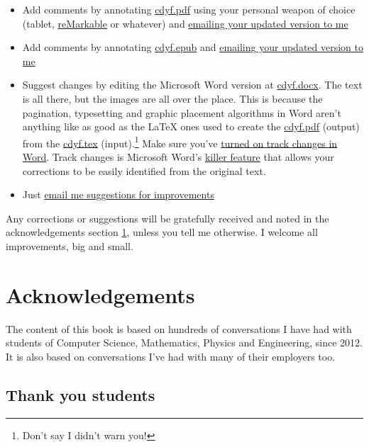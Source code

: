 \documentclass[
]{book}
\providecommand{\tightlist}{%
  \setlength{\itemsep}{0pt}\setlength{\parskip}{0pt}}
\begin{document}
\begin{itemize}
\tightlist
\item
  Add comments by annotating \href{https://www.cdyf.me/cdyf.pdf}{cdyf.pdf} using your personal weapon of choice (tablet, \href{https://en.wikipedia.org/wiki/ReMarkable}{reMarkable} or whatever) and \href{http://www.cs.man.ac.uk/~hulld/contact.html}{emailing your updated version to me}
\item
  Add comments by annotating \href{https://www.cdyf.me/cdyf.epub}{cdyf.epub} and \href{http://www.cs.man.ac.uk/~hulld/contact.html}{emailing your updated version to me}
\item
  Suggest changes by editing the Microsoft Word version at \href{http://cdyf.me/cdyf.docx}{cdyf.docx}. The text is all there, but the images are all over the place. This is because the pagination, typesetting and graphic placement algorithms in Word aren't anything like as good as the LaTeX ones used to create the \href{https://www.cdyf.me/cdyf.pdf}{cdyf.pdf} (output) from the \href{https://cdyf.me/cdyf.tex}{cdyf.tex} (input).\footnote{Don't say I didn't warn you!} Make sure you've \href{https://support.microsoft.com/en-us/office/track-changes-in-word-197ba630-0f5f-4a8e-9a77-3712475e806a}{turned on track changes in Word}. Track changes is Microsoft Word's \href{https://en.wikipedia.org/wiki/Killer_feature}{killer feature} that allows your corrections to be easily identified from the original text.
\item
  Just \href{http://www.cs.man.ac.uk/~hulld/contact.html}{email me suggestions for improvements}
\end{itemize}

Any corrections or suggestions will be gratefully received and noted in the acknowledgements section \ref{thanks}, unless you tell me otherwise. I welcome all improvements, big and small.

\hypertarget{thanks}{%
\section{Acknowledgements}\label{thanks}}

The content of this book is based on hundreds of conversations I have had with students of Computer Science, Mathematics, Physics and Engineering, since 2012. It is also based on conversations I've had with many of their employers too.

\hypertarget{students}{%
\subsection{Thank you students}\label{students}}
\end{document}
